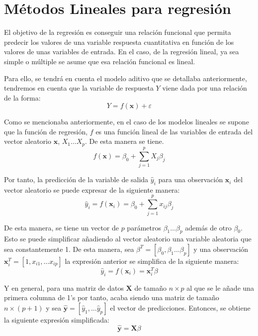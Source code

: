 \section{Métodos Lineales para regresión}
\noindent El objetivo de la regresión es conseguir una relación funcional que permita predecir los valores de una variable respuesta cuantitativa en función de los valores de unas variables de entrada. En el caso, de la regresión lineal, ya sea simple o múltiple se asume que esa relación funcional es lineal. 

\noindent Para ello, se tendrá en cuenta el modelo aditivo que se detallaba anteriormente, tendremos en cuenta que la variable de respuesta $Y$ viene dada por una relación de la forma:
\begin{equation}
Y=f(\textbf{x})+\varepsilon
\end{equation}

\noindent Como se mencionaba anteriormente, en el caso de los modelos lineales se supone que la función de regresión, $f$ es una función lineal de las variables de entrada del vector aleatorio $\textbf{x}$,  $X_1\ldots X_p$. De esta manera se tiene. 
\begin{equation}
f(\textbf{x})=\beta_0+\sum_{j=1}^p X_j\beta_j
\end{equation}

\noindent Por tanto, la predicción de la variable de salida $\hat{y
}_i$ para una observación $\textbf{x}_i$ del vector aleatorio  se puede expresar de la siguiente manera:
\begin{equation}
\hat{y}_i=f(\textbf{x}_i)=\beta_0+\sum_{j=1}^p x_{ij}\beta_j
\end{equation}

\noindent De esta manera, se tiene un vector de $p$ parámetros $\beta_1 \ldots \beta_p$ además de otro $\beta_0$. Esto se puede simplificar añadiendo al vector aleatorio una variable aleatoria que sea constantemente 1. De esta manera, sea $\beta^T=[\beta_0,\beta_1\ldots \beta_p]$ y una observación $\textbf{x}_i^T=[1,x_{i1},\ldots x_{ip}]$ la expresión anterior se simplifica de la siguiente manera: 
\begin{equation}
\hat{y}_i= f(\textbf{x}_i)=\textbf{x}_i^T\beta
\end{equation}

\noindent Y en general, para una matriz de datos $\textbf{X}$ de tamaño $n\times p $ al que se le añade una primera columna de 1's por tanto, acaba siendo una matriz de tamaño $n\times (p+1)$ y sea $\hat{\textbf{y}}=[\hat{y}_1,\ldots \hat{y}_p]$ el vector de predicciones. Entonces, se obtiene la siguiente expresión  simplificada:
\begin{equation}
\hat{\textbf{y}}=\textbf{X}\beta
\end{equation} 

